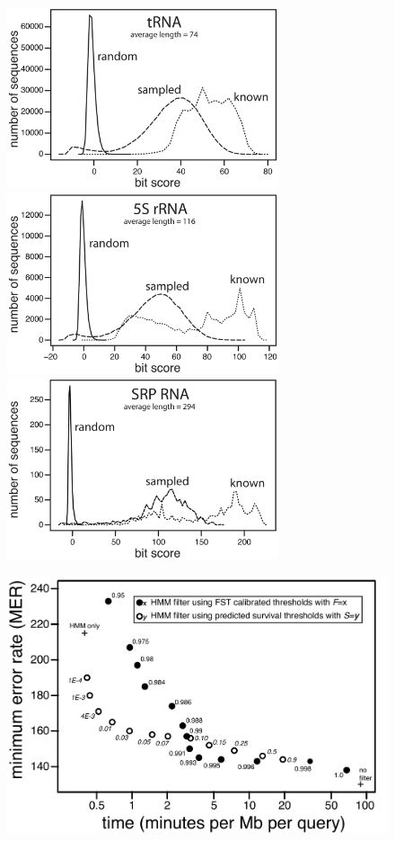\documentclass[11pt]{article}
\begin{document}
\begin{figure}
\begin{center}
\includegraphics[height=2.1in]{figs/tRNA_sh}

\includegraphics[height=2.1in]{figs/5S_sh}

\includegraphics[height=2.1in]{figs/SRP_sh}

\label{Fig:hists}
\end{center}
\end{figure}

\newpage

\begin{figure}[h]
\centerline{\includegraphics[width=6.4in]{figs/mervtime}}

\label{Fig:mervtime}
\end{figure}
\end{document}
